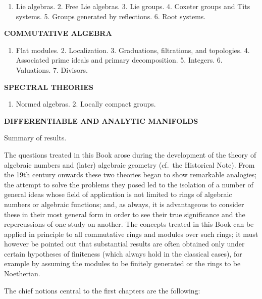 \begin{enumerate}
\def\labelenumi{\arabic{enumi}.}
\tightlist
\item
  Lie algebras. 2. Free Lie algebras. 3. Lie groups. 4. Coxeter groups and Tits systems. 5. Groups generated by reflections. 6. Root systems.
\end{enumerate}

\textbf{COMMUTATIVE ALGEBRA}\par

\begin{enumerate}
\def\labelenumi{\arabic{enumi}.}
\tightlist
\item
  Flat modules. 2. Localization. 3. Graduations, filtrations, and topologies. 4. Associated prime ideals and primary decomposition. 5. Integers. 6. Valuations. 7. Divisors.
\end{enumerate}

\textbf{SPECTRAL THEORIES}\par

\begin{enumerate}
\def\labelenumi{\arabic{enumi}.}
\tightlist
\item
  Normed algebras. 2. Locally compact groups.
\end{enumerate}

\textbf{DIFFERENTIABLE AND ANALYTIC MANIFOLDS}\par

Summary of results.


The questions treated in this Book arose during the development of the theory of algebraic numbers and (later) algebraic geometry (cf.~the Historical Note). From the 19th century onwards these two theories began to show remarkable analogies; the attempt to solve the problems they posed led to the isolation of a number of general ideas whose field of application is not limited to rings of algebraic numbers or algebraic functions; and, as always, it is advantageous to consider these in their most general form in order to see their true significance and the repercussions of one study on another. The concepts treated in this Book can be applied in principle to all commutative rings and modules over such rings; it must however be pointed out that substantial results are often obtained only under certain hypotheses of finiteness (which always hold in the classical cases), for example by assuming the modules to be finitely generated or the rings to be Noetherian.

The chief notions central to the first chapters are the following:

